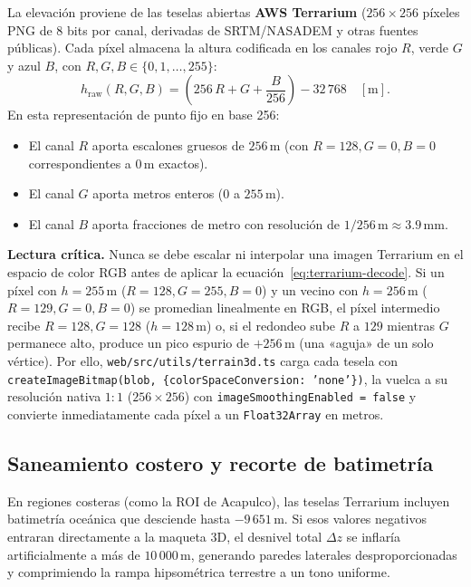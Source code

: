 \documentclass[11pt,a4paper]{article}
\newcommand{\src}[1]{\nolinkurl{#1}}
\newcommand{\unit}[1]{\mathrm{#1}}
\newcommand{\warn}[1]{\par\noindent\colorbox{blue!8}{\parbox{.965\linewidth}{\textbf{Lectura crítica.} #1}}\par}
\begin{document}
La elevación proviene de las teselas abiertas \textbf{AWS Terrarium} ($256\times256$ píxeles PNG de 8 bits por
canal, derivadas de SRTM/NASADEM y otras fuentes públicas). Cada píxel almacena la altura codificada en los
canales rojo $R$, verde $G$ y azul $B$, con $R,G,B\in\{0,1,\ldots,255\}$:
\begin{equation}
  h_{\mathrm{raw}}(R,G,B) = \left(256\,R + G + \frac{B}{256}\right) - 32\,768\quad[\unit{m}].
  \label{eq:terrarium-decode}
\end{equation}
En esta representación de punto fijo en base 256:
\begin{itemize}
  \item El canal $R$ aporta escalones gruesos de $256\,\unit{m}$ (con $R=128, G=0, B=0$ correspondientes a
        $0\,\unit{m}$ exactos).
  \item El canal $G$ aporta metros enteros ($0$ a $255\,\unit{m}$).
  \item El canal $B$ aporta fracciones de metro con resolución de $1/256\,\unit{m}\approx 3.9\,\unit{mm}$.
\end{itemize}

\warn{Nunca se debe escalar ni interpolar una imagen Terrarium en el espacio de color RGB antes de aplicar la
ecuación~\eqref{eq:terrarium-decode}. Si un píxel con $h=255\,\unit{m}$ ($R=128,G=255,B=0$) y un vecino con
$h=256\,\unit{m}$ ($R=129,G=0,B=0$) se promedian linealmente en RGB, el píxel intermedio recibe $R=128,G=128$
($h=128\,\unit{m}$) o, si el redondeo sube $R$ a $129$ mientras $G$ permanece alto, produce un pico espurio
de $+256\,\unit{m}$ (una «aguja» de un solo vértice). Por ello, \src{web/src/utils/terrain3d.ts} carga cada
tesela con \texttt{createImageBitmap(blob, \{colorSpaceConversion: 'none'\})}, la vuelca a su resolución
nativa $1:1$ ($256\times256$) con \texttt{imageSmoothingEnabled = false} y convierte inmediatamente cada píxel
a un \texttt{Float32Array} en metros.}

\subsection{Saneamiento costero y recorte de batimetría}
\label{sec:relieve3d-saneamiento}

En regiones costeras (como la ROI de Acapulco), las teselas Terrarium incluyen batimetría oceánica que desciende
hasta $-9\,651\,\unit{m}$. Si esos valores negativos entraran directamente a la maqueta 3D, el desnivel total
$\Delta z$ se inflaría artificialmente a más de $10\,000\,\unit{m}$, generando paredes laterales desproporcionadas
y comprimiendo la rampa hipsométrica terrestre a un tono uniforme.
\end{document}
